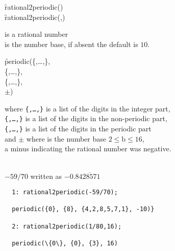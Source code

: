 \begin{description}[labelwidth=!,leftmargin=20mm]
\item[\textbf{SYNTAX:}]
  \begin{syntax}
    \f{rational2periodic()}\\
    \f{rational2periodic(,)}
  \end{syntax}

\item[\textbf{INPUT:}]
   \hspace{3mm} is a rational number\\
   \hspace{3mm} is the number base, if absent the default is $10$.

\item[\textbf{RESULT:}]
  \begin{syntax}
    \f{periodic(}\{,\ldots,\},\\
    \{,\ldots,\},\\
    \{,\ldots,\},\\
    $\pm$)
    \end{syntax}
  where  \texttt{\{,\ldots,\}} is a list of the digits in the integer part,\\
  \texttt{\{,\ldots,\}} is a list of the digits in the non-periodic part,\\
  \texttt{\{,\ldots,\}} is a list of the digits in the periodic part\\
  and $\pm$ where  is the number base $2 \leq \mathrm{b} \leq 16$, \\
  a minus indicating the rational number  was negative.

\item[\textbf{EXAMPLES:}]\mbox{}\\
  $-59/70$ written as $-0.8\overline{428571}$
\begin{verbatim}
  1: rational2periodic(-59/70);

  periodic({0}, {8}, {4,2,8,5,7,1}, -10)}

  2: rational2periodic(1/80,16);

  periodic(\{0\}, {0}, {3}, 16)  
\end{verbatim}
\end{description}

